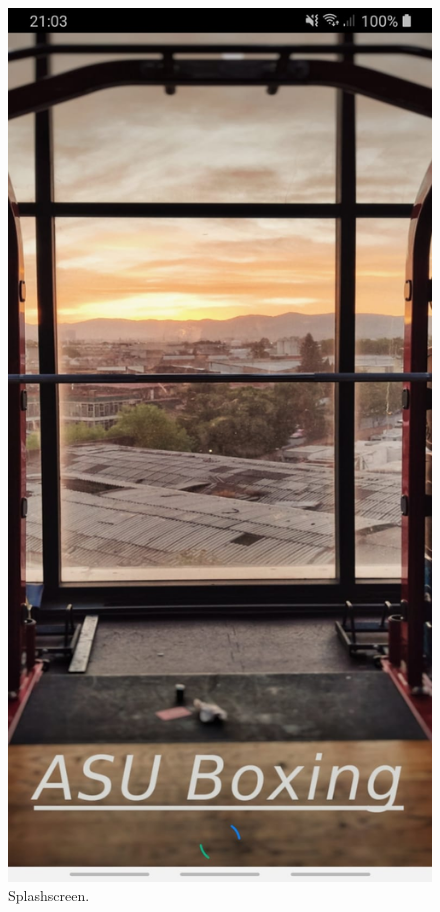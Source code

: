 \documentclass[a4paper,12pt]{report}
\begin{document}
\begin{figure}[ht]
\begin{minipage}[b]{0.5\linewidth}
    \includegraphics[width=.7\linewidth]{images/aplicationImages/splashScreen.jpeg} 
    \caption{Splashscreen.} 
    \vspace{4ex}
  \end{minipage} 
\end{figure}
\end{document}
